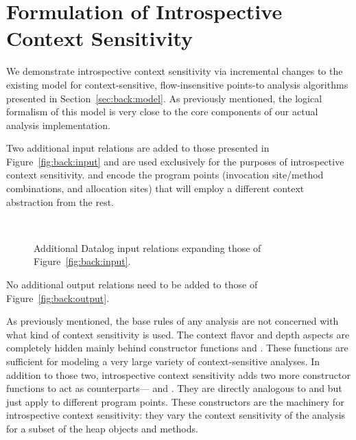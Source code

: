\section{Formulation of Introspective Context Sensitivity}
\label{sec:introspect:model}

We demonstrate introspective context sensitivity via incremental changes to the existing model for context-sensitive, flow-insensitive points-to analysis algorithms presented in Section~\ref{sec:back:model}. As previously mentioned, the logical formalism of this model is very close to the core components of our actual analysis implementation.

Two additional input relations are added to those presented in Figure~\ref{fig:back:input} and are used exclusively for the purposes of introspective context sensitivity.  and  encode the program points (invocation site/method combinations, and allocation sites) that will employ a different context abstraction from the rest.

\begin{figure}[hb]
\begin{datalog}
 \\ 
\end{datalog}
\caption[Additional Datalog input relations]{Additional Datalog input relations expanding those of Figure~\ref{fig:back:input}.}
\label{fig:introspect:input}
\end{figure}

No additional output relations need to be added to those of Figure~\ref{fig:back:output}.

As previously mentioned, the base rules of any analysis are not concerned with what kind of context sensitivity is used. The context flavor and depth aspects are completely hidden mainly behind constructor functions  and . These functions are sufficient for modeling a very large variety of context-sensitive analyses. In addition to those two, introspective context sensitivity adds two more constructor functions to act as counterparts--- and . They are directly analogous to  and  but just apply to different program points. These constructors are the machinery for introspective context sensitivity: they vary the context sensitivity of the analysis for a subset of the heap objects and methods.


